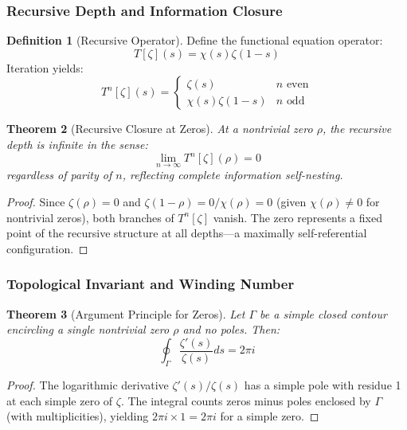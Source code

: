 \documentclass[12pt]{article}
\theoremstyle{plain}
\newtheorem{theorem}{Theorem}[section]
\theoremstyle{definition}
\newtheorem{definition}[theorem]{Definition}
\begin{document}
\subsubsection{Recursive Depth and Information Closure}

\begin{definition}[Recursive Operator]
Define the functional equation operator:
$$T[\zeta](s) = \chi(s) \zeta(1-s)$$
Iteration yields:
$$T^n[\zeta](s) = \begin{cases}
\zeta(s) & n \text{ even} \\
\chi(s)\zeta(1-s) & n \text{ odd}
\end{cases}$$
\end{definition}

\begin{theorem}[Recursive Closure at Zeros]\label{thm:recursive_closure}
At a nontrivial zero $\rho$, the recursive depth is infinite in the sense:
$$\lim_{n \to \infty} T^n[\zeta](\rho) = 0$$
regardless of parity of $n$, reflecting complete information self-nesting.
\end{theorem}

\begin{proof}
Since $\zeta(\rho) = 0$ and $\zeta(1-\rho) = 0/\chi(\rho) = 0$ (given $\chi(\rho) \neq 0$ for nontrivial zeros), both branches of $T^n[\zeta]$ vanish. The zero represents a fixed point of the recursive structure at all depths—a maximally self-referential configuration.
\end{proof}

\subsubsection{Topological Invariant and Winding Number}

\begin{theorem}[Argument Principle for Zeros]\label{thm:winding_number}
Let $\Gamma$ be a simple closed contour encircling a single nontrivial zero $\rho$ and no poles. Then:
\begin{equation}
\oint_{\Gamma} \frac{\zeta'(s)}{\zeta(s)} ds = 2\pi i
\end{equation}
\end{theorem}

\begin{proof}
The logarithmic derivative $\zeta'(s)/\zeta(s)$ has a simple pole with residue 1 at each simple zero of $\zeta$. The integral counts zeros minus poles enclosed by $\Gamma$ (with multiplicities), yielding $2\pi i \times 1 = 2\pi i$ for a simple zero.
\end{proof}
\end{document}
